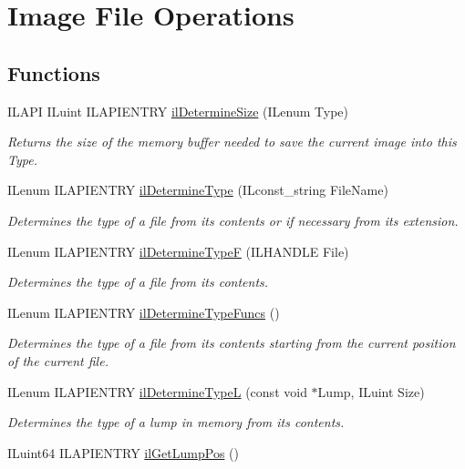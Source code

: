 \hypertarget{group__file}{\section{Image File Operations}
\label{group__file}
}
\subsection*{Functions}
\begin{DoxyCompactItemize}
\item 
I\-L\-A\-P\-I I\-Luint I\-L\-A\-P\-I\-E\-N\-T\-R\-Y \hyperlink{group__file_ga1a1701a1dbec445a4e184a189707d2cd}{il\-Determine\-Size} (I\-Lenum Type)
\begin{DoxyCompactList}\small\item\em Returns the size of the memory buffer needed to save the current image into this Type. \end{DoxyCompactList}\item 
I\-Lenum I\-L\-A\-P\-I\-E\-N\-T\-R\-Y \hyperlink{group__file_ga910c033593bbdb2d6018ecbe2aeab089}{il\-Determine\-Type} (I\-Lconst\-\_\-string File\-Name)
\begin{DoxyCompactList}\small\item\em Determines the type of a file from its contents or if necessary from its extension. \end{DoxyCompactList}\item 
I\-Lenum I\-L\-A\-P\-I\-E\-N\-T\-R\-Y \hyperlink{group__file_gad4fad086e3c82e04e022254f8e4b8492}{il\-Determine\-Type\-F} (I\-L\-H\-A\-N\-D\-L\-E File)
\begin{DoxyCompactList}\small\item\em Determines the type of a file from its contents. \end{DoxyCompactList}\item 
I\-Lenum I\-L\-A\-P\-I\-E\-N\-T\-R\-Y \hyperlink{group__file_ga4b9f6b7a5c4a97a916efa67d2ce64546}{il\-Determine\-Type\-Funcs} ()
\begin{DoxyCompactList}\small\item\em Determines the type of a file from its contents starting from the current position of the current file. \end{DoxyCompactList}\item 
I\-Lenum I\-L\-A\-P\-I\-E\-N\-T\-R\-Y \hyperlink{group__file_ga706207244bcf99e76f299c5e43800300}{il\-Determine\-Type\-L} (const void $\ast$Lump, I\-Luint Size)
\begin{DoxyCompactList}\small\item\em Determines the type of a lump in memory from its contents. \end{DoxyCompactList}\item 
\hypertarget{group__file_gad3dba757768898d1833540d6c7a3686b}{I\-Luint64 I\-L\-A\-P\-I\-E\-N\-T\-R\-Y \hyperlink{group__file_gad3dba757768898d1833540d6c7a3686b}{il\-Get\-Lump\-Pos} ()}\label{group__file_gad3dba757768898d1833540d6c7a3686b}


\end{DoxyCompactItemize}
